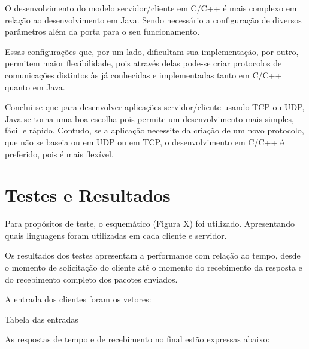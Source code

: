 \documentclass[12pt,a4paper]{article}
\begin{document}
O desenvolvimento do modelo servidor/cliente em C/C++ é mais complexo em relação ao desenvolvimento em Java. Sendo necessário a configuração de diversos parâmetros além da porta para o seu funcionamento.

Essas configurações que, por um lado, dificultam sua implementação, por outro, permitem maior flexibilidade, pois através delas pode-se criar protocolos de comunicações distintos às já conhecidas e implementadas tanto em C/C++ quanto em Java.

Conclui-se que para desenvolver aplicações servidor/cliente usando TCP ou UDP, Java se torna uma boa escolha pois permite um desenvolvimento mais simples, fácil e rápido. Contudo, se a aplicação necessite da criação de um novo protocolo, que não se baseia ou em UDP ou em TCP, o desenvolvimento em C/C++ é preferido, pois é mais flexível.
\newpage
\section{Testes e Resultados}
Para propósitos de teste, o esquemático (Figura X) foi utilizado. Apresentando quais linguagens foram utilizadas em cada cliente e servidor.

Os resultados dos testes apresentam a performance com relação ao tempo, desde o momento de solicitação do cliente até o momento do recebimento da resposta e do recebimento completo dos pacotes enviados.

A entrada dos clientes foram os vetores:

Tabela das entradas

As respostas de tempo e de recebimento no final estão expressas abaixo:
\end{document}
